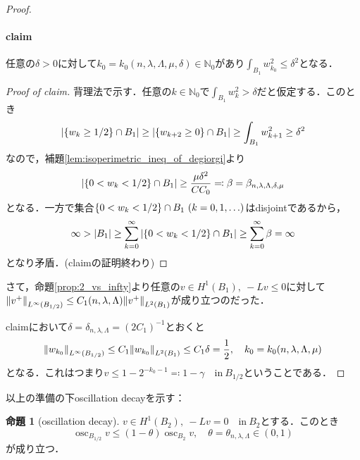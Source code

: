 \documentclass[a4paper]{ltjsarticle}
\newcommand{\Nset}{\mathbb{N}}
\newcommand{\inn}{\quad\text{in}\ }
\newcommand{\1}{\mathbbm{1}}
\DeclareMathOperator*{\osc}{\mathrm{osc}}
\numberwithin{equation}{section}
\theoremstyle{definition}
\newtheorem{prop}[thm]{命題}
\begin{document}
\begin{proof}
    \paragraph{claim}任意の$\delta>0$に対して$k_0=k_0(n,\lambda,\Lambda,\mu,\delta)\in\Nset_0$があり$\int_{B_1}w_{k_0}^2\leq \delta^2$となる．
    \begin{proof}[Proof of claim]
        背理法で示す．任意の$k\in\Nset_0$で$\int_{B_1}w_{k}^2>\delta$だと仮定する．このとき
        \begin{equation}
            \abs{\qty{w_k\geq1/2}\cap B_1}\geq \abs{\qty{w_{k+2}\geq0}\cap B_1}\geq \int_{B_1}w_{k+1}^2\geq\delta^2 
        \end{equation}
        なので，補題\ref{lem:isoperimetric_ineq_of_degiorgi}より
        \begin{equation}
            \abs{\qty{0<w_k<1/2}\cap B_1}\geq \frac{\mu\delta^2}{CC_0}\eqqcolon \beta=\beta_{n,\lambda,\Lambda,\delta,\mu}
        \end{equation}
        となる．一方で集合$\qty{0<w_k<1/2}\cap B_1\ (k=0,1,\ldots)$はdisjointであるから，
        \begin{equation}
            \infty>\abs{B_1}\geq \sum_{k=0}^{\infty}\abs{\qty{0<w_k<1/2}\cap B_1}\geq \sum_{k=0}^{\infty}\beta=\infty
        \end{equation}
        となり矛盾．(claimの証明終わり)
    \end{proof}
    さて，命題\ref{prop:2_vs_infty}より任意の$v\in H^1(B_1),\ -Lv\leq 0$に対して$\norm{v^+}_{L^\infty(B_{1/2})}\leq C_1(n,\lambda,\Lambda)\norm{v^+}_{L^2(B_1)}$が成り立つのだった．

    claimにおいて$\delta=\delta_{n,\lambda,\Lambda}=(2C_1)^{-1}$とおくと
    \begin{equation}
        \norm{w_{k_0}}_{L^\infty(B_{1/2})}\leq C_1\norm{w_{k_0}}_{L^2(B_1)}\leq C_1\delta= \frac{1}{2},\quad k_0=k_0(n,\lambda,\Lambda,\mu) 
    \end{equation}
    となる．これはつまり$v\leq 1-2^{-k_0-1}\eqqcolon 1-\gamma\inn B_{1/2}$ということである．
\end{proof}
以上の準備の下oscillation decayを示す：
\begin{prop}[oscillation decay]
    $v\in H^1(B_2),\ -Lv=0\inn B_2$とする．このとき
    \begin{equation}
        \osc_{B_{1/2}}v\leq (1-\theta)\osc_{B_2}v,\quad \theta=\theta_{n,\lambda,\Lambda}\in (0,1) 
    \end{equation}
    が成り立つ．
\end{prop}
\end{document}
